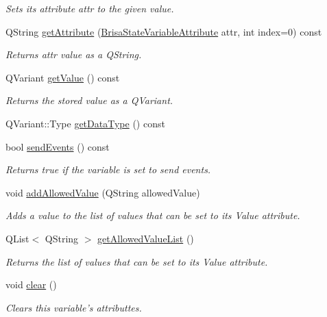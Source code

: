 \begin{DoxyCompactItemize}
\begin{DoxyCompactList}\small\item\em Sets its attribute {\itshape attr\/} to the given {\itshape value\/}. \item\end{DoxyCompactList}\item 
QString \hyperlink{classBrisaUpnp_1_1BrisaStateVariable_ad653413985f270a34de1527638c8ef14}{getAttribute} (\hyperlink{classBrisaUpnp_1_1BrisaStateVariable_af6afe40d25c8990351bc7205dada3249}{BrisaStateVariableAttribute} attr, int index=0) const 
\begin{DoxyCompactList}\small\item\em Returns {\itshape attr\/} value as a QString. \item\end{DoxyCompactList}\item 
QVariant \hyperlink{classBrisaUpnp_1_1BrisaStateVariable_a81c90483c7527267cf1c5835a72fbe2d}{getValue} () const 
\begin{DoxyCompactList}\small\item\em Returns the stored value as a QVariant. \item\end{DoxyCompactList}\item 
QVariant::Type \hyperlink{classBrisaUpnp_1_1BrisaStateVariable_ab6b498fd30c4c2906befa82d92dc2846}{getDataType} () const 
\item 
bool \hyperlink{classBrisaUpnp_1_1BrisaStateVariable_a71040c4fb731b7c285d5fe1a4d625af6}{sendEvents} () const 
\begin{DoxyCompactList}\small\item\em Returns true if the variable is set to send events. \item\end{DoxyCompactList}\item 
void \hyperlink{classBrisaUpnp_1_1BrisaStateVariable_ae3acf52298795f54b76cd2de0731a6f2}{addAllowedValue} (QString allowedValue)
\begin{DoxyCompactList}\small\item\em Adds a value to the list of values that can be set to its Value attribute. \item\end{DoxyCompactList}\item 
QList$<$ QString $>$ \hyperlink{classBrisaUpnp_1_1BrisaStateVariable_a47dbb6806ce07fc43d4a804f3ce68de3}{getAllowedValueList} ()
\begin{DoxyCompactList}\small\item\em Returns the list of values that can be set to its Value attribute. \item\end{DoxyCompactList}\item 
void \hyperlink{classBrisaUpnp_1_1BrisaStateVariable_a44e2e9d0545fddce098694a8d824b212}{clear} ()
\begin{DoxyCompactList}\small\item\em Clears this variable's attributtes. \item\end{DoxyCompactList}\end{DoxyCompactItemize}


